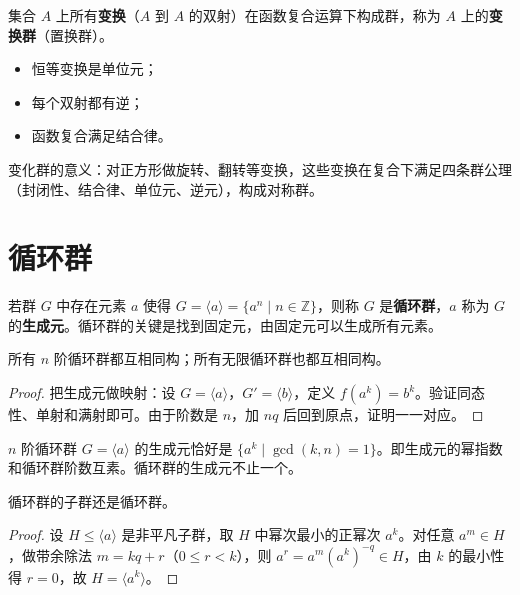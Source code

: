 \begin{definition}[变换群]
集合 $A$ 上所有\textbf{变换}（$A$ 到 $A$ 的双射）在函数复合运算下构成群，称为 $A$ 上的\textbf{变换群}（置换群）。
\begin{itemize}
  \item 恒等变换是单位元；
  \item 每个双射都有逆；
  \item 函数复合满足结合律。
\end{itemize}
\end{definition}

\begin{note}
变化群的意义：对正方形做旋转、翻转等变换，这些变换在复合下满足四条群公理（封闭性、结合律、单位元、逆元），构成对称群。
\end{note}

\section{循环群}

\begin{definition}[循环群（定义 1.25）]
若群 $G$ 中存在元素 $a$ 使得 $G = \langle a \rangle = \{a^n \mid n \in \mathbb{Z}\}$，则称 $G$ 是\textbf{循环群}，$a$ 称为 $G$ 的\textbf{生成元}。循环群的关键是找到固定元，由固定元可以生成所有元素。
\end{definition}

\begin{proposition}[命题 1.2.9：$n$ 阶循环群互相同构]
所有 $n$ 阶循环群都互相同构；所有无限循环群也都互相同构。
\end{proposition}

\begin{proof}
把生成元做映射：设 $G = \langle a \rangle$，$G' = \langle b \rangle$，定义 $f(a^k) = b^k$。验证同态性、单射和满射即可。由于阶数是 $n$，加 $nq$ 后回到原点，证明一一对应。
\end{proof}

\begin{proposition}[命题 1.30：生成元的刻画]
$n$ 阶循环群 $G = \langle a \rangle$ 的生成元恰好是 $\{a^k \mid \gcd(k, n) = 1\}$。即生成元的幂指数和循环群阶数互素。循环群的生成元不止一个。
\end{proposition}

\begin{proposition}[循环群的子群]
循环群的子群还是循环群。
\end{proposition}

\begin{proof}
设 $H \le \langle a \rangle$ 是非平凡子群，取 $H$ 中幂次最小的正幂次 $a^k$。对任意 $a^m \in H$，做带余除法 $m = kq + r$（$0 \le r < k$），则 $a^r = a^m (a^k)^{-q} \in H$，由 $k$ 的最小性得 $r = 0$，故 $H = \langle a^k \rangle$。
\end{proof}


